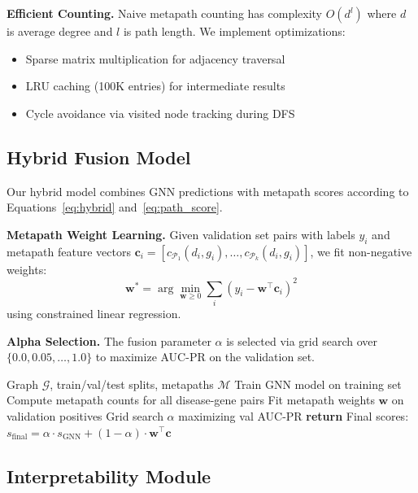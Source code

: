 \documentclass{article}
\newcommand{\vect}[1]{\mathbf{#1}}
\newcommand{\set}[1]{\mathcal{#1}}
\begin{document}
\textbf{Efficient Counting.} Naive metapath counting has complexity $O(d^l)$ where $d$ is average degree and $l$ is path length. We implement optimizations:
\begin{itemize}
    \item Sparse matrix multiplication for adjacency traversal
    \item LRU caching (100K entries) for intermediate results
    \item Cycle avoidance via visited node tracking during DFS
\end{itemize}

\subsection{Hybrid Fusion Model}
\label{sec:hybrid}

Our hybrid model combines GNN predictions with metapath scores according to Equations~\ref{eq:hybrid} and~\ref{eq:path_score}.

\textbf{Metapath Weight Learning.} Given validation set pairs with labels $y_i$ and metapath feature vectors $\vect{c}_i = [c_{\set{P}_1}(d_i, g_i), \ldots, c_{\set{P}_k}(d_i, g_i)]$, we fit non-negative weights:
\begin{equation}
    \vect{w}^* = \arg\min_{\vect{w} \geq 0} \sum_i \left(y_i - \vect{w}^\top \vect{c}_i\right)^2
\end{equation}
using constrained linear regression.

\textbf{Alpha Selection.} The fusion parameter $\alpha$ is selected via grid search over $\{0.0, 0.05, \ldots, 1.0\}$ to maximize AUC-PR on the validation set.

\begin{algorithm}[t]
\caption{Hybrid Model Training and Inference}
\label{alg:hybrid}
\begin{algorithmic}[1]
\REQUIRE Graph $\set{G}$, train/val/test splits, metapaths $\set{M}$
\STATE Train GNN model on training set
\STATE Compute metapath counts for all disease-gene pairs
\STATE Fit metapath weights $\vect{w}$ on validation positives
\STATE Grid search $\alpha$ maximizing val AUC-PR
\STATE \textbf{return} Final scores: $s_{\text{final}} = \alpha \cdot s_{\text{GNN}} + (1-\alpha) \cdot \vect{w}^\top \vect{c}$
\end{algorithmic}
\end{algorithm}

\subsection{Interpretability Module}
\end{document}
